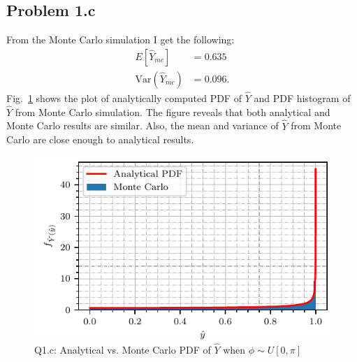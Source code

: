 \subsection*{Problem 1.c}
From the Monte Carlo simulation I get the following:
\begin{align*}
	E[\hat{Y}_{mc}] &= 0.635\\
	\text{Var}(\hat{Y}_{mc}) &= 0.096.
\end{align*}
Fig.~\ref{fig:q1_unif_phi_mc} shows the plot of analytically computed PDF of $\hat{Y}$ and PDF histogram of $\hat{Y}$ from Monte Carlo simulation. The figure reveals that both analytical and Monte Carlo results are similar. Also, the mean and variance of $\hat{Y}$ from Monte Carlo are close enough to analytical results.
\begin{figure}[!h]
	\centering
	\includegraphics[scale=1.0,trim={0cm 0cm 0cm 0cm},clip]{./code/generatedPlots/q1_unif_phi_mc.pdf}
	\caption{Q1.c: Analytical vs. Monte Carlo PDF of $\hat{Y}$ when $\phi \sim U[0,\pi]$}
	\label{fig:q1_unif_phi_mc}
\end{figure}
